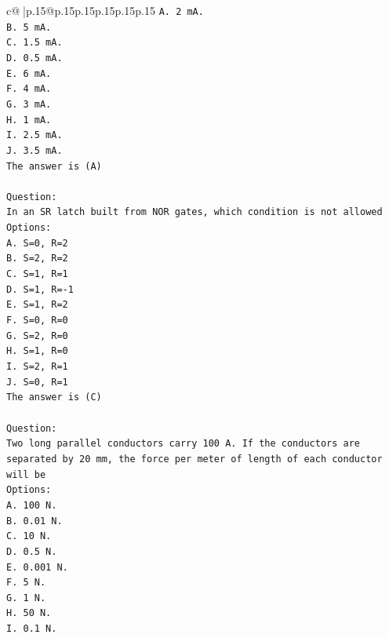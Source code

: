 \documentclass{article}
\begin{document}
{\begin{supertabular}{c@{$\;$}|p{.15\linewidth}@{}p{.15\linewidth}p{.15\linewidth}p{.15\linewidth}p{.15\linewidth}p{.15\linewidth}}
{{{\texttt{A. 2 mA.} \\
\texttt{B. 5 mA.} \\
\texttt{C. 1.5 mA.} \\
\texttt{D. 0.5 mA.} \\
\texttt{E. 6 mA.} \\
\texttt{F. 4 mA.} \\
\texttt{G. 3 mA.} \\
\texttt{H. 1 mA.} \\
\texttt{I. 2.5 mA.} \\
\texttt{J. 3.5 mA.} \\
\texttt{The answer is (A)} \\
\\ 
\texttt{Question:} \\
\texttt{In an SR latch built from NOR gates, which condition is not allowed} \\
\texttt{Options:} \\
\texttt{A. S=0, R=2} \\
\texttt{B. S=2, R=2} \\
\texttt{C. S=1, R=1} \\
\texttt{D. S=1, R={-}1} \\
\texttt{E. S=1, R=2} \\
\texttt{F. S=0, R=0} \\
\texttt{G. S=2, R=0} \\
\texttt{H. S=1, R=0} \\
\texttt{I. S=2, R=1} \\
\texttt{J. S=0, R=1} \\
\texttt{The answer is (C)} \\
\\ 
\texttt{Question:} \\
\texttt{Two long parallel conductors carry 100 A. If the conductors are separated by 20 mm, the force per meter of length of each conductor will be} \\
\texttt{Options:} \\
\texttt{A. 100 N.} \\
\texttt{B. 0.01 N.} \\
\texttt{C. 10 N.} \\
\texttt{D. 0.5 N.} \\
\texttt{E. 0.001 N.} \\
\texttt{F. 5 N.} \\
\texttt{G. 1 N.} \\
\texttt{H. 50 N.} \\
\texttt{I. 0.1 N.} \\
}}}
\end{supertabular}}
\end{document}
